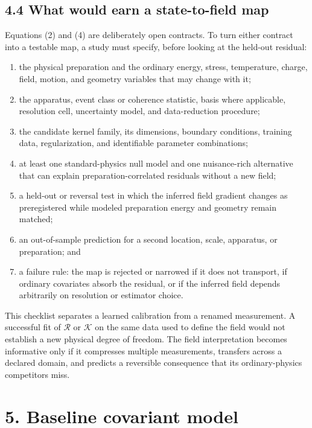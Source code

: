 \documentclass[
  american,
  11pt,
  letterpaper,
]{article}
\providecommand{\tightlist}{%
  \setlength{\itemsep}{0pt}\setlength{\parskip}{0pt}}
\begin{document}
\subsection{4.4 What would earn a state-to-field map}\label{what-would-earn-a-state-to-field-map}

Equations (2) and (4) are deliberately open contracts. To turn either contract into a testable map, a study must specify, before looking at the held-out residual:

\begin{enumerate}
\def\labelenumi{\arabic{enumi}.}
\tightlist
\item
  the physical preparation and the ordinary energy, stress, temperature, charge, field, motion, and geometry variables that may change with it;
\item
  the apparatus, event class or coherence statistic, basis where applicable, resolution cell, uncertainty model, and data-reduction procedure;
\item
  the candidate kernel family, its dimensions, boundary conditions, training data, regularization, and identifiable parameter combinations;
\item
  at least one standard-physics null model and one nuisance-rich alternative that can explain preparation-correlated residuals without a new field;
\item
  a held-out or reversal test in which the inferred field gradient changes as preregistered while modeled preparation energy and geometry remain matched;
\item
  an out-of-sample prediction for a second location, scale, apparatus, or preparation; and
\item
  a failure rule: the map is rejected or narrowed if it does not transport, if ordinary covariates absorb the residual, or if the inferred field depends arbitrarily on resolution or estimator choice.
\end{enumerate}

This checklist separates a learned calibration from a renamed measurement. A successful fit of \(\mathcal R\) or \(\mathcal K\) on the same data used to define the field would not establish a new physical degree of freedom. The field interpretation becomes informative only if it compresses multiple measurements, transfers across a declared domain, and predicts a reversible consequence that its ordinary-physics competitors miss.

\section{5. Baseline covariant model}\label{baseline-covariant-model}
\end{document}
